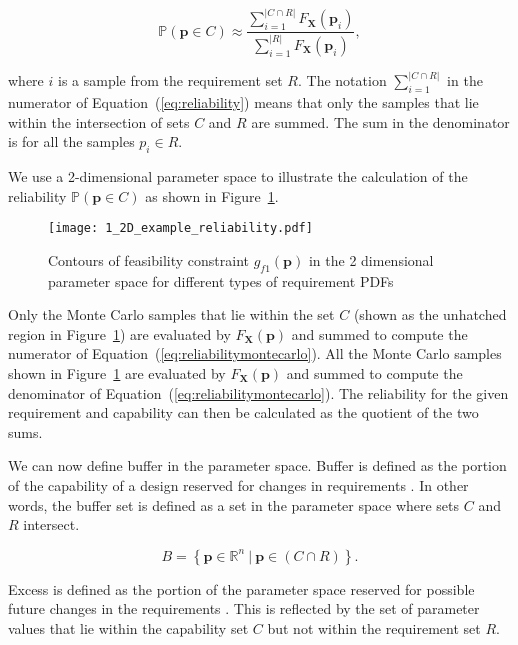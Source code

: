 \begin{equation} \label{eq:reliabilitymontecarlo}
	\mathbb{P}(\mathbf{p} \in C) \approx \dfrac{\sum\limits_{i=1}^{|{C\cap R}|} F_{\mathbf{X}}(\mathbf{p}_i)}{\sum\limits_{i=1}^{|R|} F_{\mathbf{X}}(\mathbf{p}_i)},
\end{equation}

where $i$ is a sample from the requirement set $R$. The notation $\sum_{i=1}^{|{C\cap R}|}$ in the numerator of Equation~(\ref{eq:reliability}) means that only the samples that lie within the intersection of sets $C$ and $R$ are summed. The sum in the denominator is for all the samples $p_i \in R$.

We use a 2-dimensional parameter space to illustrate the calculation of the reliability $\mathbb{P}(\mathbf{p} \in C)$ as shown in Figure~\ref{fig:2Dexamplereliability}.

\begin{figure}[h!]
	\centering
	\texttt{[image: 1\_2D\_example\_reliability.pdf]}
	\caption{Contours of feasibility constraint $g_{f1}(\mathbf{p})$ in the 2 dimensional parameter space for different types of requirement \acp{PDF}}
	\label{fig:2Dexamplereliability}
\end{figure}

Only the Monte Carlo samples that lie within the set $C$ (shown as the unhatched region in Figure~\ref{fig:2Dexamplereliability}) are evaluated by $F_{\mathbf{X}}(\mathbf{p})$ and summed to compute the numerator of Equation~(\ref{eq:reliabilitymontecarlo}). All the Monte Carlo samples shown in Figure~\ref{fig:2Dexamplereliability} are evaluated by $F_{\mathbf{X}}(\mathbf{p})$ and summed to compute the denominator of Equation~(\ref{eq:reliabilitymontecarlo}). The reliability for the given requirement and capability can then be calculated as the quotient of the two sums.

We can now define buffer in the parameter space. Buffer is defined as the portion of the capability of a design reserved for changes in requirements \cite{Eckert2019}. In other words, the buffer set is defined as a set in the parameter space where sets $C$ and $R$ intersect.

\begin{equation} \label{eq:buffer}
	\textit{B} = \left\{\mathbf{p} \in \mathbb{R}^n~|~\mathbf{p} \in \left(C\cap R\right) \right\}.
\end{equation}

Excess is defined as the portion of the parameter space reserved for possible future changes in the requirements \cite{Eckert2019}. This is reflected by the set of parameter values that lie within the capability set $C$ but not within the requirement set $R$. 

